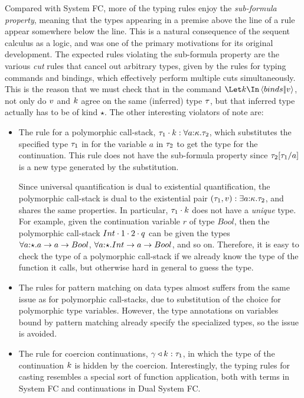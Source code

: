 \documentclass{article}
\begin{document}
Compared with System FC, more of the typing rules enjoy the
\emph{sub-formula property}, meaning that the types appearing in a
premise above the line of a rule appear somewhere below the line.
This is a natural consequence of the sequent calculus as a logic, and
was one of the primary motivations for its original development.  The
expected rules violating the sub-formula property are the various
\emph{cut} rules that cancel out arbitrary types, given by the rules
for typing commands and bindings, which effectively perform multiple
cuts simultaneously.  This is the reason that we must check that in
the command $\mcut{\binds}{\tm}{\ko}$, not only do $v$ and $k$
agree on the same (inferred) type $\tau$, but that inferred type
actually has to be of kind $\star$.  The other interesting violators
of note are:
\begin{itemize}
\item The rule for a polymorphic call-stack,
  ${\tau_1}\cdot{k} : \forall a{:}{\kappa}.\tau_2$, which substitutes
  the specified type $\tau_1$ in for the variable $a$ in $\tau_2$ to get
  the type for the continuation.  This rule does not have the
  sub-formula property since $\tau_2[\tau_1/a]$ is a new type generated
  by the substitution.

  Since universal quantification is dual to existential
  quantification, the polymorphic call-stack is dual to the
  existential pair $(\tau_1,v) : \exists a{:}{\kappa}.\tau_2$, and
  shares the same properties.  In particular, ${\tau_1}\cdot{k}$ does
  not have a \emph{unique} type.  For example, given the continuation
  variable $r$ of type $Bool$, then the polymorphic call-stack
  ${Int}\cdot{{1}\cdot{{2}\cdot{q}}}$ can be given the types
  $\forall a{:}{\star}. a \to a \to Bool$,
  $\forall a{:}{\star}. Int \to a \to Bool$, and so on.  Therefore,
  it is easy to check the type of a polymorphic call-stack if we
  already know the type of the function it calls, but otherwise hard
  in general to guess the type.

\item The rules for pattern matching on data types almost suffers from
  the same issue as for polymorphic call-stacks, due to substitution
  of the choice for polymorphic type variables.  However, the type
  annotations on variables bound by pattern matching already specify
  the specialized types, so the issue is avoided.

\item The rule for coercion continuations,
  ${\gamma}\triangleleft{k} : \tau_1$, in which the type of the continuation
  $k$ is hidden by the coercion.  Interestingly, the typing rules
  for casting resembles a special sort of function application, both
  with terms in System FC and continuations in Dual System FC.
\end{itemize}
\end{document}
